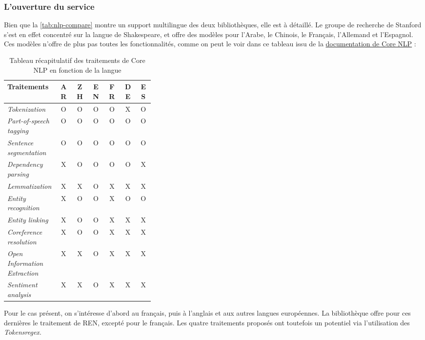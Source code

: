 \subsubsection{L'ouverture du service}
Bien que la \autoref{tab:nlp-compare} montre un support multilingue des deux bibliothèques, elle est à détaillé. Le groupe de recherche de Stanford s'est en effet concentré sur la langue de Shakespeare, et offre des modèles pour l'Arabe, le Chinois, le Français, l'Allemand et l'Espagnol. Ces modèles n'offre de plus pas toutes les fonctionnalités, comme on peut le voir dans ce tableau issu de la \href{https://stanfordnlp.github.io/CoreNLP/human-languages.html}{documentation de Core NLP} :
\vspace{10pt}
\begin{table}[H]
    \centering
    \begin{tabular}{| p{0.35\linewidth} | c | c | c | c | c | c |}
        \hline
        \textbf{Traitements} &AR &ZH &EN &FR &DE &ES\\
        \hline 
        \hline
        \textit{Tokenization} &O &O &O &O &X &O\\
        \hline
        \textit{Part-of-speech tagging} &O &O &O &O &O &O\\		
        \hline 
        \textit{Sentence segmentation} &O &O &O &O &O &O\\
        \hline 
        \textit{Dependency parsing} &X &O &O &O &O &X\\
        \hline
        \textit{Lemmatization} &X &X &O &X &X &X\\
        \hline 
        \textit{Entity recognition} &X &O &O &X &O &O\\
        \hline 
        \textit{Entity linking} &X &O &O &X &X &X\\
        \hline 
        \textit{Coreference resolution} &X &O &O &X &X &X\\
        \hline 
        \textit{Open Information Extraction} &X &X &O &X &X &X\\
        \hline 
        \textit{Sentiment analysis} &X &X &O &X &X &X\\
        \hline
    \end{tabular}
    \caption{Tableau récapitulatif des traitements de Core NLP en fonction de la langue}
    \label{tab:corenlp-lang}
\end{table}
\vspace{10pt}

Pour le cas présent, on s'intéresse d'abord au français, puis à l'anglais et aux autres langues européennes. La bibliothèque offre pour ces dernières le traitement de REN, excepté pour le français. Les quatre traitements proposés ont toutefois un potentiel via l'utilisation des \textit{Tokensregex}.
\newline

